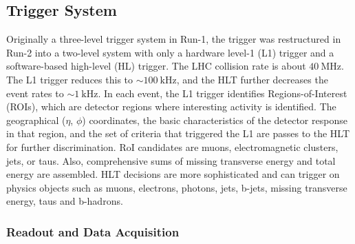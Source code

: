 \iffalse
\subsection{Trigger and DAQ}
\textcolor{blue}{Timing and  trigger control logic, the TDAQ system is complex computing system to acquire and store data.  It is partitioned into sub-systems that are typically affiliated with with sub-detectors that have the same logic components and building blocks.}  \fi
\subsection{Trigger System}
Originally a three-level trigger system in Run-1, the trigger was restructured in Run-2 into a two-level system with only a hardware level-1 (L1) trigger and a software-based high-level (HL) trigger.  The LHC collision rate is about $40~\mathrm{MHz}$.  The L1 trigger reduces this to $\sim100~\mathrm{kHz}$, and the HLT further decreases the event rates to $\sim1~\mathrm{kHz}$.  In each event, the L1 trigger identifies Regions-of-Interest (ROIs), which are detector regions where interesting activity is identified. The geographical ($\eta$, $\phi$) coordinates, the basic characteristics of the detector response in that region, and the set of criteria that triggered the L1 are passes to the HLT for further discrimination.  RoI candidates are muons, electromagnetic clusters, jets, or taus.  Also, comprehensive sums of missing transverse energy and total energy are assembled.  HLT decisions are more sophisticated and can trigger on physics objects such as muons, electrons, photons, jets, b-jets, missing transverse energy, taus and b-hadrons.  


\iffalse
\subsubsection{Readout and Data Acquisition}


